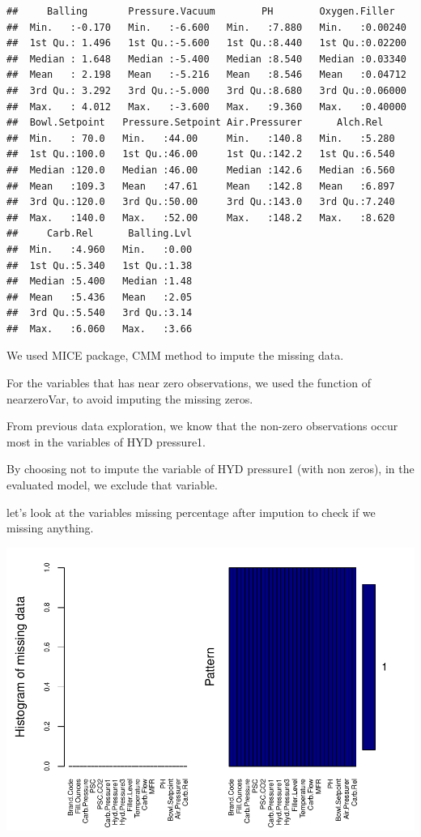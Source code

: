 \documentclass[]{article}
\begin{document}
\begin{verbatim}
##     Balling       Pressure.Vacuum        PH        Oxygen.Filler    
##  Min.   :-0.170   Min.   :-6.600   Min.   :7.880   Min.   :0.00240  
##  1st Qu.: 1.496   1st Qu.:-5.600   1st Qu.:8.440   1st Qu.:0.02200  
##  Median : 1.648   Median :-5.400   Median :8.540   Median :0.03340  
##  Mean   : 2.198   Mean   :-5.216   Mean   :8.546   Mean   :0.04712  
##  3rd Qu.: 3.292   3rd Qu.:-5.000   3rd Qu.:8.680   3rd Qu.:0.06000  
##  Max.   : 4.012   Max.   :-3.600   Max.   :9.360   Max.   :0.40000  
##  Bowl.Setpoint   Pressure.Setpoint Air.Pressurer      Alch.Rel    
##  Min.   : 70.0   Min.   :44.00     Min.   :140.8   Min.   :5.280  
##  1st Qu.:100.0   1st Qu.:46.00     1st Qu.:142.2   1st Qu.:6.540  
##  Median :120.0   Median :46.00     Median :142.6   Median :6.560  
##  Mean   :109.3   Mean   :47.61     Mean   :142.8   Mean   :6.897  
##  3rd Qu.:120.0   3rd Qu.:50.00     3rd Qu.:143.0   3rd Qu.:7.240  
##  Max.   :140.0   Max.   :52.00     Max.   :148.2   Max.   :8.620  
##     Carb.Rel      Balling.Lvl  
##  Min.   :4.960   Min.   :0.00  
##  1st Qu.:5.340   1st Qu.:1.38  
##  Median :5.400   Median :1.48  
##  Mean   :5.436   Mean   :2.05  
##  3rd Qu.:5.540   3rd Qu.:3.14  
##  Max.   :6.060   Max.   :3.66
\end{verbatim}

We used MICE package, CMM method to impute the missing data.

For the variables that has near zero observations, we used the function
of nearzeroVar, to avoid imputing the missing zeros.

From previous data exploration, we know that the non-zero observations
occur most in the variables of HYD pressure1.

By choosing not to impute the variable of HYD pressure1 (with non
zeros), in the evaluated model, we exclude that variable.

let's look at the variables missing percentage after impution to check
if we missing anything.

\begin{center}\includegraphics{OmerOzeren_GracieHan_Project_2_files/figure-latex/unnamed-chunk-15-1} \end{center}
\end{document}
